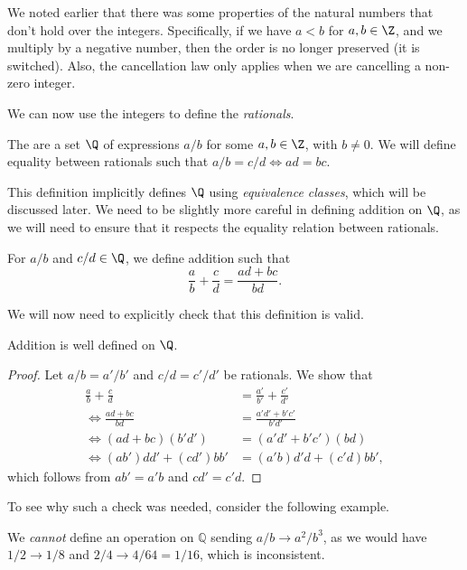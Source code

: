 \documentclass[a4paper]{scrreprt}
\begin{document}
\begin{remark}[Caveats]
	We noted earlier that there was some properties of the natural numbers that don't hold over the integers. Specifically, if we have $a < b$ for $a, b \in \Z$, and we multiply by a negative number, then the order is no longer preserved (it is switched). Also, the cancellation law only applies when we are cancelling a non-zero integer.
\end{remark}

We can now use the integers to define the \emph{rationals}.

\begin{definition}[Rationals]
	The  are a set $\Q$ of expressions $a/b$ for some $a, b \in \Z$, with $b \neq 0$. We will define equality between rationals such that $a/b = c/d \iff ad = bc$. 
\end{definition}

This definition implicitly defines $\Q$ using \emph{equivalence classes}, which will be discussed later. 
We need to be slightly more careful in defining addition on $\Q$, as we will need to ensure that it respects the equality relation between rationals. 

\begin{definition}[Addition on $\Q$]
	For $a/b$ and $c/d \in \Q$, we define addition such that
	$$
	\frac{a}{b} + \frac{c}{d} = \frac{ad + bc}{bd}.
	$$
\end{definition}

We will now need to explicitly check that this definition is valid.
\begin{proposition}
	Addition is well defined on $\Q$.
\end{proposition}
\begin{proof}
	Let $a/b = a'/b'$ and $c/d = c'/d'$ be rationals. We show that
\begin{align*}
	\frac{a}{b} + \frac{c}{d} &= \frac{a'}{b'} + \frac{c'}{d'} \\
\iff \frac{ad + bc}{bd} &= \frac{a'd' + b'c'}{b'd'} \\
\iff (ad + bc)(b'd') &= (a'd' + b'c')(bd) \\
\iff (ab')dd' + (cd')bb' &= (a'b)d'd + (c'd)bb', 
\end{align*}
which follows from $ab' = a'b$ and $cd' = c'd$.
\end{proof}

To see why such a check was needed, consider the following example.

\begin{example}
	We \emph{cannot} define an operation on $\mathbb{Q}$ sending $a/b \rightarrow a^2 / b^3$, as we would have $1/2 \rightarrow 1/8$ and $2/4 \rightarrow 4/64 = 1/16$, which is inconsistent.
\end{example}
\end{document}
